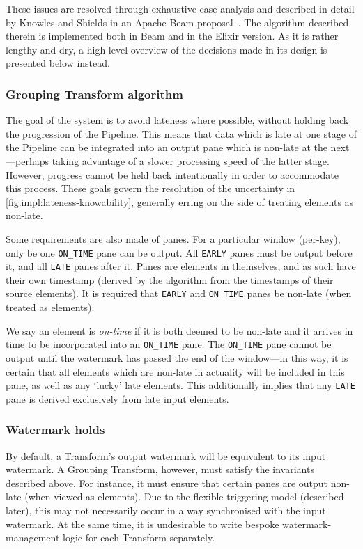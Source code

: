 These issues are resolved through exhaustive case analysis and described in detail by Knowles and Shields in an Apache Beam proposal~\cite{BEAM-doc-lateness}.
The algorithm described therein is implemented both in Beam and in the Elixir version.
As it is rather lengthy and dry, a high-level overview of the decisions made in its design is presented below instead.

\subsubsection{Grouping Transform algorithm}

The goal of the system is to avoid lateness where possible, without holding back the progression of the Pipeline.
This means that data which is late at one stage of the Pipeline can be integrated into an output pane which is non-late at the next---perhaps taking advantage of a slower processing speed of the latter stage.
However, progress cannot be held back intentionally in order to accommodate this process.
These goals govern the resolution of the uncertainty in \cref{fig:impl:lateness-knowability}, generally erring on the side of treating elements as non-late.

Some requirements are also made of panes.
For a particular window (per-key), only be one \verb|ON_TIME| pane can be output.
All \verb|EARLY| panes must be output before it, and all \verb|LATE| panes after it.
Panes are elements in themselves, and as such have their own timestamp (derived by the algorithm from the timestamps of their source elements).
It is required that \verb|EARLY| and \verb|ON_TIME| panes be non-late (when treated as elements).

We say an element is \emph{on-time} if it is both deemed to be non-late and it arrives in time to be incorporated into an \verb|ON_TIME| pane.
The \verb|ON_TIME| pane cannot be output until the watermark has passed the end of the window---in this way, it is certain that all elements which are non-late in actuality will be included in this pane, as well as any `lucky' late elements.
This additionally implies that any \verb|LATE| pane is derived exclusively from late input elements.

\subsubsection{Watermark holds}

By default, a Transform's output watermark will be equivalent to its input watermark.
A Grouping Transform, however, must satisfy the invariants described above.
For instance, it must ensure that certain panes are output non-late (when viewed as elements).
Due to the flexible triggering model (described later), this may not necessarily occur in a way synchronised with the input watermark.
At the same time, it is undesirable to write bespoke watermark-management logic for each Transform separately.

